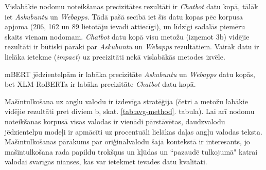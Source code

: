 






Vislabākie nodomu noteikšanas precizitātes rezultāti ir \textit{Chatbot} datu kopā, tālāk iet \textit{Askubuntu} un \textit{Webapps}. Tādā pašā secībā iet šīs datu kopas pēc korpusa apjoma (206, 162 un 89 lietotāju ievadi attiecīgi), un līdzīgi sadalās piemēru skaits vienam nodomam. \textit{Chatbot} datu kopā visu metožu (izņemot 3b) vidējie rezultāti ir būtiski pārāki par \textit{Askubuntu} un \textit{Webapps} rezultātiem. Vairāk datu ir lielāka ietekme (\textit{impact}) uz precizitāti nekā vislabākās metodes izvēle.

mBERT jēdzientelpām ir labāka precizitāte \textit{Askubuntu} un \textit{Webapps} datu kopās, bet XLM-RoBERTa ir labāka precizitāte \textit{Chatbot} datu kopā.

Mašīntulkošana uz angļu valodu ir izdevīga stratēģija (četri a metožu labākie vidējie rezultāti pret diviem b, skat. \ref{tab:avg-method}. tabula). Lai arī nodomu noteikšanas korpusā visas valodas ir vienādi pārstāvētas, daudzvalodu jēdzientelpu modeļi ir apmācīti uz procentuāli lielākas daļas angļu valodas teksta. Mašīntulkošanas pārākums par oriģinālvalodu šajā kontekstā ir interesants, jo mašīntulkošana rada papildu trokšņus un kļūdas un ``pazaudē tulkojumā" katrai valodai svarīgās nianses, kas var ietekmēt ievades datu kvalitāti.

